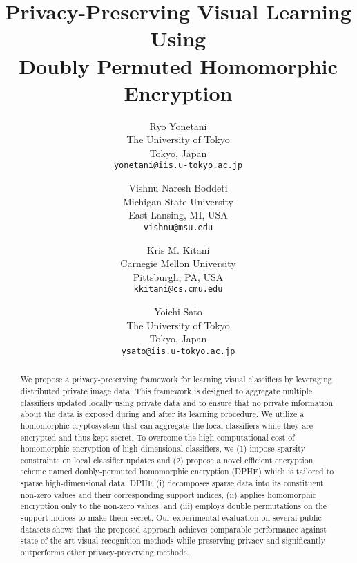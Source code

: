 \documentclass[10pt,twocolumn,letterpaper]{article}
\begin{document}
\title{Privacy-Preserving Visual Learning Using \\Doubly Permuted Homomorphic Encryption}

\author{Ryo Yonetani\\
The University of Tokyo\\
Tokyo, Japan\\
{\tt\small yonetani@iis.u-tokyo.ac.jp}
\and
Vishnu Naresh Boddeti\\
Michigan State University\\
East Lansing, MI, USA\\
{\tt\small vishnu@msu.edu}
\and
Kris M. Kitani\\
Carnegie Mellon University\\
Pittsburgh, PA, USA\\
{\tt\small kkitani@cs.cmu.edu}
\and
Yoichi Sato\\
The University of Tokyo\\
Tokyo, Japan\\
{\tt\small ysato@iis.u-tokyo.ac.jp}
}

\maketitle
\thispagestyle{empty}


\begin{abstract}
We propose a privacy-preserving framework for learning visual classifiers by leveraging distributed private image data. This framework is designed to aggregate multiple classifiers updated locally using private data and to ensure that no private information about the data is exposed during and after its learning procedure. We utilize a homomorphic cryptosystem that can aggregate the local classifiers while they are encrypted and thus kept secret. To overcome the high computational cost of homomorphic encryption of high-dimensional classifiers, we (1) impose sparsity constraints on local classifier updates and (2) propose a novel efficient encryption scheme named doubly-permuted homomorphic encryption (DPHE) which is tailored to sparse high-dimensional data. DPHE (i) decomposes sparse data into its constituent non-zero values and their corresponding support indices, (ii) applies homomorphic encryption only to the non-zero values, and (iii) employs double permutations on the support indices to make them secret. Our experimental evaluation on several public datasets shows that the proposed approach achieves comparable performance against state-of-the-art visual recognition methods while preserving privacy and significantly outperforms other privacy-preserving methods.
\end{abstract}
\end{document}
